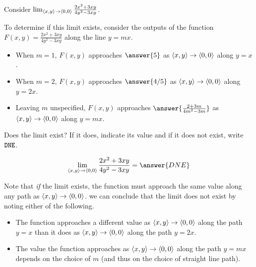 \documentclass{ximera}
\author{Jim Talamo \and Bart Snapp}
\begin{document}
\begin{exercise}

Consider $ \lim_{\left\langle x,y\right\rangle\to \left\langle 0,0\right\rangle}\frac{2x^2+3 x y}{4y^2-3xy}$.
    
    To determine if this limit exists, consider the outputs of the function $F(x,y) = \frac{2x^2+3 x y}{4y^2-3xy}$ along the line $y = m x$.
    \begin{itemize}
    \item When $m = 1$, $F(x,y)$ approaches $\answer{5}$ as $\left\langle x,y\right\rangle \to \left\langle 0,0\right\rangle$ along $y= x$.
    \item When $m = 2$, $F(x,y)$ approaches  $\answer{4/5}$  as $\left\langle x,y\right\rangle \to \left\langle 0,0\right\rangle$ along $y= 2 x$.
    \item Leaving $m$ unspecified, $F(x,y)$ approaches  $\answer{\frac{2+3m}{4m^2-3m}}$  as $\left\langle x,y\right\rangle \to \left\langle 0,0\right\rangle$ along $y= m x$.
    \end{itemize}
  
\begin{exercise}  
  Does the limit exist? If it does, indicate its value and if it does not exist, write $\verb|DNE|$.

  \[
  \lim_{\vector{x,y}\to \vector{0,0}}\frac{2x^2+3 x y}{4y^2-3xy} = \answer{DNE}
  \]
  
  \begin{feedback}[correct]
  Note that \emph{if} the limit exists, the function must approach the same value along any path as $\left\langle x,y\right\rangle \to \left\langle 0,0\right\rangle$.  we can conclude that the limit does not exist by noting either of the following.
  
  \begin{itemize}
  \item The function approaches a different value as $\left\langle x,y\right\rangle \to \left\langle 0,0\right\rangle$ along the path $y=x$ than it does as $\left\langle x,y\right\rangle \to \left\langle 0,0\right\rangle$ along the path $y=2x$.
  \item The value the function approaches as $\left\langle x,y\right\rangle \to \left\langle 0,0\right\rangle$ along the path $y=mx$ depends on the choice of $m$ (and thus on the choice of straight line path).
  \end{itemize}
  \end{feedback}
 \end{exercise}
\end{exercise}
\end{document}
